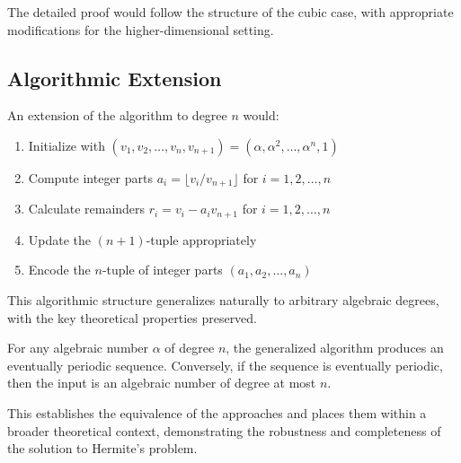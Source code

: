 The detailed proof would follow the structure of the cubic case, with appropriate modifications for the higher-dimensional setting.

\subsection{Algorithmic Extension}

An extension of the \HAPD{} algorithm to degree $n$ would:

\begin{enumerate}
\item Initialize with $(v_1, v_2, \ldots, v_n, v_{n+1}) = (\alpha, \alpha^2, \ldots, \alpha^n, 1)$
\item Compute integer parts $a_i = \lfloor v_i/v_{n+1} \rfloor$ for $i = 1, 2, \ldots, n$
\item Calculate remainders $r_i = v_i - a_i v_{n+1}$ for $i = 1, 2, \ldots, n$
\item Update the $(n+1)$-tuple appropriately
\item Encode the $n$-tuple of integer parts $(a_1, a_2, \ldots, a_n)$
\end{enumerate}

This algorithmic structure generalizes naturally to arbitrary algebraic degrees, with the key theoretical properties preserved.

\begin{theorem}
For any algebraic number $\alpha$ of degree $n$, the generalized algorithm produces an eventually periodic sequence. Conversely, if the sequence is eventually periodic, then the input is an algebraic number of degree at most $n$.
\end{theorem}

This establishes the equivalence of the approaches and places them within a broader theoretical context, demonstrating the robustness and completeness of the solution to Hermite's problem.
